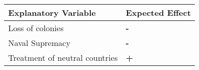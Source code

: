\begin{tabular}{ll}
\hline \hline
Explanatory Variable & Expected Effect  \\ \hline
Loss of colonies & \textbf{-}                  \\
Naval Supremacy & \textbf{-}                 \\
Treatment of neutral countries &       \textbf{+}      \\ \hline 
\end{tabular}